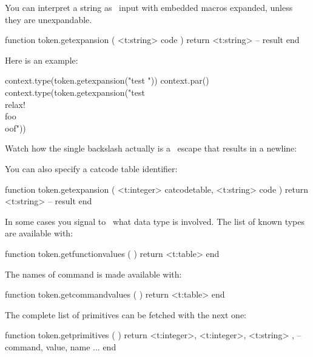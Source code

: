 \startlines
\getbuffer
\stoplines

You can interpret a string as \TEX\ input with embedded macros expanded, unless
they are unexpandable.

\starttyping[option=LUA]
function token.getexpansion ( <t:string> code )
    return <t:string> -- result
end
\stoptyping

Here is an example:

\startbuffer
          \def\foo{foo}
\protected{}

\startluacode
context.type(token.getexpansion("test \relax"))
context.par()
context.type(token.getexpansion("test \\relax{!} \\foo\\oof"))
\stopluacode
\stopbuffer

\typebuffer

Watch how the single backslash actually is a \LUA\ escape that results in
a newline:

\startlines
\getbuffer
\stoplines

You can also specify a catcode table identifier:

\starttyping[option=LUA]
function token.getexpansion (
    <t:integer> catcodetable,
    <t:string>  code
)
    return <t:string> -- result
end
\stoptyping


\stopsubsection

\startsubsection[title={Information}]

In some cases you signal to \LUA\ what data type is involved. The list of known
types are available with:

\starttyping[option=LUA]
function token.getfunctionvalues ( )
    return <t:table>
end
\stoptyping

\startcolumns[n=3]
\stopcolumns

The names of command is made available with:

\starttyping[option=LUA]
function token.getcommandvalues ( )
    return <t:table>
end
\stoptyping

\startcolumns[n=2]
\stopcolumns

The complete list of primitives can be fetched with the next one:

\starttyping[option=LUA]
function token.getprimitives ( )
    return {
        { <t:integer>, <t:integer>, <t:string> }, -- command, value, name
        ...
    }
end
\stoptyping


